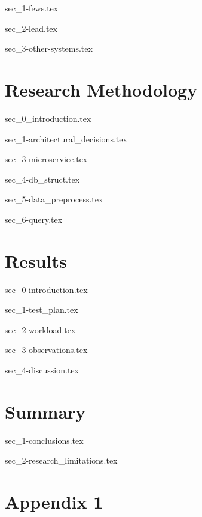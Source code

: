 \documentclass[a4paper,oneside,12pt]{report}
\begin{document}
{sec_1-fews.tex}

{sec_2-lead.tex}

{sec_3-other-systems.tex}

\chapter{Research Methodology}
\label{ch:method}

{sec_0_introduction.tex}
\label{se:method_intro}

{sec_1-architectural_decisions.tex}


{sec_3-microservice.tex}
\label{se:microservice}

{sec_4-db_struct.tex}
\label{se:db_struct}

{sec_5-data_preprocess.tex}
\label{se:data_preprocess}

{sec_6-query.tex}
\label{se:query}

\chapter{Results}
\label{ch:results}

{sec_0-introduction.tex}
\label{se:results_intro}

{sec_1-test_plan.tex}
\label{se:test_plan}

{sec_2-workload.tex}
\label{se:workload}

{sec_3-observations.tex}
\label{se:observations}

{sec_4-discussion.tex}
\label{se:discussion}

\chapter{Summary}
\label{ch:summary}

{sec_1-conclusions.tex}

{sec_2-research_limitations.tex}

\appendix
\chapter{Appendix 1}



\graphicspath{ {./images/} }

% 
% 
\printbibliography[title={References}]
\end{document}
